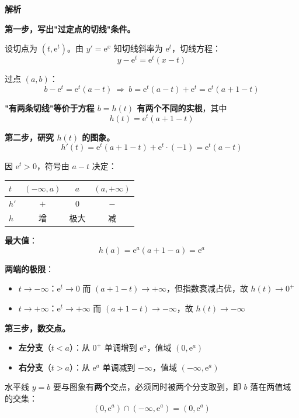 \textbf{解析}

\textbf{第一步，写出"过定点的切线"条件。}

设切点为 $\left(t,\mathrm e^{t}\right)$。由 $y'=\mathrm e^{x}$ 知切线斜率为 $\mathrm e^{t}$，切线方程：
\[y-\mathrm e^{t}=\mathrm e^{t}(x-t)\]

过点 $(a,b)$：
\[b-\mathrm e^{t}=\mathrm e^{t}(a-t)\ \Longrightarrow\ b=\mathrm e^{t}(a-t)+\mathrm e^{t}=\mathrm e^{t}(a+1-t)\]

\textbf{"有两条切线"等价于方程 $b=h(t)$ 有两个不同的实根}，其中
\[h(t)=\mathrm e^{t}(a+1-t)\]

\textbf{第二步，研究 $h(t)$ 的图象。}
\[h'(t)=\mathrm e^{t}(a+1-t)+\mathrm e^{t}\cdot(-1)=\mathrm e^{t}(a-t)\]

因 $\mathrm e^{t}>0$，符号由 $a-t$ 决定：

\begin{center}
\begin{tabular}{lccc}
\toprule
$t$ & $(-\infty,a)$ & $a$ & $(a,+\infty)$ \\
\midrule
$h'$ & $+$ & $0$ & $-$ \\
$h$ & 增 & 极大 & 减 \\
\bottomrule
\end{tabular}
\end{center}

\textbf{最大值}：
\[h(a)=\mathrm e^{a}(a+1-a)=\mathrm e^{a}\]

\textbf{两端的极限}：
\begin{itemize}
\item $t\to-\infty$：$\mathrm e^{t}\to0$ 而 $(a+1-t)\to+\infty$，但指数衰减占优，故 $h(t)\to0^{+}$
\item $t\to+\infty$：$\mathrm e^{t}\to+\infty$ 而 $(a+1-t)\to-\infty$，故 $h(t)\to-\infty$
\end{itemize}

\textbf{第三步，数交点。}

\begin{itemize}
\item \textbf{左分支}（$t<a$）：从 $0^{+}$ 单调增到 $\mathrm e^{a}$，值域 $\left(0,\mathrm e^{a}\right)$
\item \textbf{右分支}（$t>a$）：从 $\mathrm e^{a}$ 单调减到 $-\infty$，值域 $\left(-\infty,\mathrm e^{a}\right)$
\end{itemize}

水平线 $y=b$ 要与图象有\textbf{两个}交点，必须同时被两个分支取到，即 $b$ 落在两值域的交集：
\[\left(0,\mathrm e^{a}\right)\cap\left(-\infty,\mathrm e^{a}\right)=\left(0,\mathrm e^{a}\right)\]

